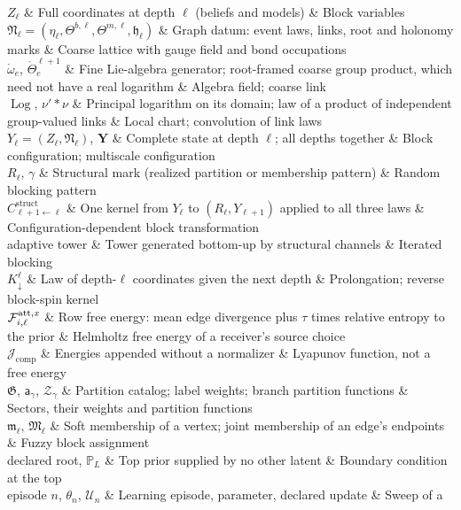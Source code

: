 \begin{decoder}
$Z_\ell$ & Full coordinates at depth $\ell$ (beliefs and models) & Block variables\\
$\mathfrak N_\ell=(\eta_\ell,\Theta^{b,\ell},\Theta^{m,\ell},\mathfrak h_\ell)$ & Graph datum: event laws,
links, root and holonomy marks & Coarse lattice with gauge field and bond occupations\\
$\mathring\omega_e$, $\mathring\Theta^{\ell+1}_e$ & Fine Lie-algebra generator; root-framed coarse group product, which need not have a real logarithm & Algebra field; coarse link\\
$\operatorname{Log}$, $\nu'*\nu$ & Principal logarithm on its domain; law of a product of independent group-valued links & Local chart; convolution of link laws\\
$Y_\ell=(Z_\ell,\mathfrak N_\ell)$, $\mathbf Y$ & Complete state at depth $\ell$; all depths together &
Block configuration; multiscale configuration\\
$R_\ell$, $\gamma$ & Structural mark (realized partition or membership pattern) & Random blocking
pattern\\
$C^{\mathrm{struct}}_{\ell+1\leftarrow\ell}$ & One kernel from $Y_\ell$ to $(R_\ell,Y_{\ell+1})$ applied to
all three laws & Configuration-dependent block transformation\\
adaptive tower & Tower generated bottom-up by structural channels & Iterated blocking\\
$K^\ell_\downarrow$ & Law of depth-$\ell$ coordinates given the next depth & Prolongation; reverse
block-spin kernel\\
$\mathcal F^{\mathrm{att},x}_{i,\ell}$ & Row free energy: mean edge divergence plus $\tau$ times relative
entropy to the prior & Helmholtz free energy of a receiver's source choice\\
$\mathcal J_{\mathrm{comp}}$ & Energies appended without a normalizer & Lyapunov function, not a free
energy\\
$\mathfrak G$, $\mathsf a_\gamma$, $\mathcal Z_\gamma$ & Partition catalog; label weights; branch
partition functions & Sectors, their weights and partition functions\\
$\mathfrak m_\ell$, $\mathfrak M_\ell$ & Soft membership of a vertex; joint membership of an edge's
endpoints & Fuzzy block assignment\\
declared root, $\mathbb P_L$ & Top prior supplied by no other latent & Boundary condition at the top\\
episode $n$, $\theta_n$, $\mathcal U_n$ & Learning episode, parameter, declared update & Sweep of a

\end{decoder}
